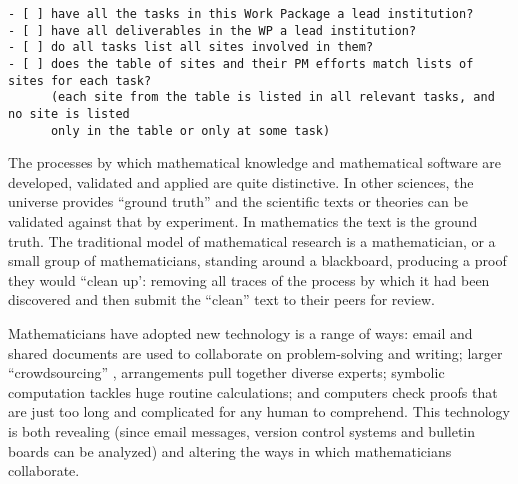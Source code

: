 \begin{draft}
\begin{verbatim}
- [ ] have all the tasks in this Work Package a lead institution?
- [ ] have all deliverables in the WP a lead institution?
- [ ] do all tasks list all sites involved in them? 
- [ ] does the table of sites and their PM efforts match lists of sites for each task?
      (each site from the table is listed in all relevant tasks, and no site is listed
      only in the table or only at some task)
\end{verbatim}
\end{draft}



\begin{workpackage}[id=social-aspects,wphases=0-48,
  title=Social Aspects,
  lead=UO,
  UORM=27,USHRM=8, USORM=6] 


\begin{wpobjectives}

The processes by which mathematical knowledge and mathematical
software are developed, validated and applied are quite
distinctive. In other sciences, the universe provides ``ground truth''
and the scientific texts or theories can be validated against that by
experiment. In mathematics the text is the ground truth. The
traditional model of mathematical research is a mathematician, or a
small group of mathematicians, standing around a blackboard, producing
a proof they would ``clean up': removing all traces of the process
by which it had been discovered and then submit the ``clean'' text to
their peers for review.

Mathematicians have adopted new technology is a range of ways: email
and shared documents are used to collaborate on problem-solving and
writing; larger ``crowdsourcing'' \cite{polymath_SIAM, PolymathBlog},
arrangements pull together diverse experts; symbolic computation
tackles huge routine calculations; and computers check proofs that are
just too long and complicated for any human to comprehend. This
technology is both revealing (since email messages, version control
systems and bulletin boards can be analyzed) and altering the ways in
which mathematicians collaborate.


\end{wpobjectives}
\end{workpackage}
